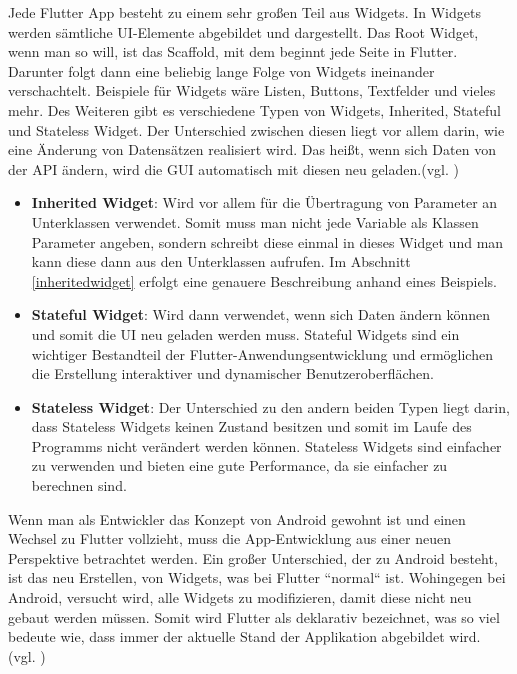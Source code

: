 \label{subsec:thero:widgets}
Jede Flutter App besteht zu einem sehr großen Teil aus Widgets. In Widgets werden sämtliche UI-Elemente abgebildet und dargestellt. Das Root Widget, wenn man so will, ist das Scaffold, mit dem beginnt jede Seite in Flutter. Darunter folgt dann eine beliebig lange Folge von Widgets ineinander verschachtelt. Beispiele für Widgets wäre Listen, Buttons, Textfelder und vieles mehr. Des Weiteren gibt es verschiedene Typen von Widgets, Inherited, Stateful und Stateless Widget. Der Unterschied zwischen diesen liegt vor allem darin, wie eine Änderung von Datensätzen realisiert wird. Das heißt, wenn sich Daten von der API ändern, wird die GUI automatisch mit diesen neu geladen.(vgl. \cite{Flutter-Widgets})
\begin{itemize}
    \item \textbf{Inherited Widget}: Wird vor allem für die Übertragung von Parameter an Unterklassen verwendet. Somit muss man nicht jede Variable als Klassen Parameter angeben, sondern schreibt diese einmal in dieses Widget und man kann diese dann aus den Unterklassen aufrufen. Im Abschnitt \ref{inheritedwidget} erfolgt eine genauere Beschreibung anhand eines Beispiels.
    
    \item \textbf{Stateful Widget}: Wird dann verwendet, wenn sich Daten ändern können und somit die UI neu geladen werden muss. Stateful Widgets sind ein wichtiger Bestandteil der Flutter-Anwendungsentwicklung und ermöglichen die Erstellung interaktiver und dynamischer Benutzeroberflächen.

    \item \textbf{Stateless Widget}: Der Unterschied zu den andern beiden Typen liegt darin, dass Stateless Widgets keinen Zustand besitzen und somit im Laufe des Programms nicht verändert werden können. Stateless Widgets sind einfacher zu verwenden und bieten eine gute Performance, da sie einfacher zu berechnen sind.
\end{itemize}

 \label{subsec:thero:statemanagement}
Wenn man als Entwickler das Konzept von Android gewohnt ist und einen Wechsel zu Flutter vollzieht, muss die App-Entwicklung aus einer neuen Perspektive betrachtet werden. Ein großer Unterschied, der zu Android besteht, ist das neu Erstellen, von Widgets, was bei Flutter ``normal`` ist. Wohingegen bei Android, versucht wird, alle Widgets zu modifizieren, damit diese nicht neu gebaut werden müssen. Somit wird Flutter als deklarativ bezeichnet, was so viel bedeute wie, dass immer der aktuelle Stand der Applikation abgebildet wird. (vgl. \cite{Flutter-State-Managment})


